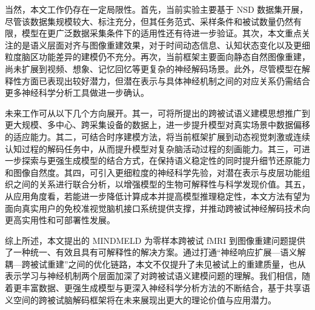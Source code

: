当然，本文工作仍存在一定局限性。首先，当前实验主要基于 NSD 数据集开展，尽管该数据集规模较大、标注充分，但其任务范式、采样条件和被试数量仍然有限，模型在更广泛数据采集条件下的适用性还有待进一步验证。其次，本文重点关注的是语义层面对齐与图像重建效果，对于时间动态信息、认知状态变化以及更细粒度脑区功能差异的建模仍不充分。再次，当前框架主要面向静态自然图像重建，尚未扩展到视频、想象、记忆回忆等更复杂的神经解码场景。此外，尽管模型在解释性方面已表现出较好潜力，但潜在表示与具体神经机制之间的对应关系仍需结合更多神经科学分析工具做进一步确认。

未来工作可从以下几个方向展开。其一，可将所提出的跨被试语义建模思想推广到更大规模、多中心、跨采集设备的数据上，进一步提升模型对真实场景中数据偏移的适应能力。其二，可结合时序建模方法，将当前框架扩展到动态视觉刺激或连续认知过程的解码任务中，从而提升模型对复杂脑活动过程的刻画能力。其三，可进一步探索与更强生成模型的结合方式，在保持语义稳定性的同时提升细节还原能力和图像自然度。其四，可引入更细粒度的神经科学先验，对潜在表示与皮层功能组织之间的关系进行联合分析，以增强模型的生物可解释性与科学发现价值。其五，从应用角度看，若能进一步降低计算成本并提高模型推理稳定性，本文方法有望为面向真实用户的免校准视觉脑机接口系统提供支撑，并推动跨被试神经解码技术向更高实用性和可部署性发展。

综上所述，本文提出的 MINDMELD 为零样本跨被试 fMRI 到图像重建问题提供了一种统一、有效且具有可解释性的解决方案。通过打通“神经响应扩展—语义解耦—跨被试重建”之间的优化链路，本文不仅提升了未见被试上的重建质量，也从表示学习与神经机制两个层面加深了对跨被试语义建模问题的理解。我们相信，随着更丰富数据、更强生成模型与更深入神经科学分析方法的不断结合，基于共享语义空间的跨被试脑解码框架将在未来展现出更大的理论价值与应用潜力。

\chapterbib
